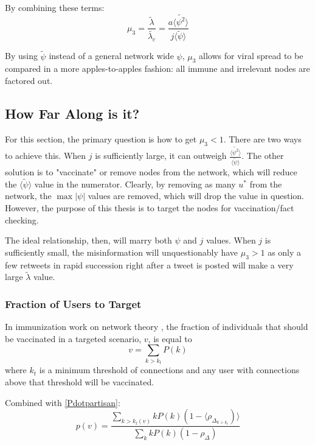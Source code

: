 \documentclass[preprint,review,12pt]{elsarticle}
\begin{document}
By combining these terms:
\begin{equation}
\label{mu_3 equation}
    \mu_3 = \frac{\tilde{\lambda}}{\tilde{\lambda_c}} = \frac{a \langle \tilde{\psi^2} \rangle}{j\langle \tilde{\psi} \rangle}
\end{equation}

By using $\tilde{\psi}$ instead of a general network wide $\psi$, $\mu_3$ allows for viral spread to be compared in a more apples-to-apples fashion: all immune and irrelevant nodes are factored out. 


\subsection{How Far Along is it?}
For this section, the primary question is how to get $\mu_3 < 1$. There are two ways to achieve this. When $j$ is sufficiently large, it can outweigh $\frac{\langle \tilde{\psi^2} \rangle}{\langle \tilde{\psi} \rangle}$. The other solution is to "vaccinate" or remove nodes from the network, which will reduce the $\langle \tilde{\psi} \rangle$ value in the numerator. Clearly, by removing as many $u^*$ from the network, the $\max |\psi|$ values are removed, which will drop the value in question. However, the purpose of this thesis is to target the nodes for vaccination/fact checking. 

The ideal relationship, then, will marry both $\psi$ and $j$ values. When $j$ is sufficiently small, the misinformation will unquestionably have $\mu_3 > 1$ as only a few retweets in rapid succession right after a tweet is posted will make a very large $\tilde{\lambda}$ value.

\subsubsection{Fraction of Users to Target}
In immunization work on network theory \citep{pastor2002immunization}, the fraction of individuals that should be vaccinated in a targeted scenario, $v$, is equal to 
\begin{equation}
    v = \sum_{k > k_t}P(k)
\end{equation}
where $k_t$ is a minimum threshold of connections and any user with connections above that threshold will be vaccinated. 

Combined with \ref{Pdotpartisan}:
\begin{equation}
\label{probability of vaccinated}
p(v) = \frac{\sum_{k>k_t(v)}kP(k)(1-\langle \rho_{\Delta_{k>k_t}})\rangle}{\sum_{k}kP(k)(1-\rho_{\Delta})}
\end{equation}
\end{document}
